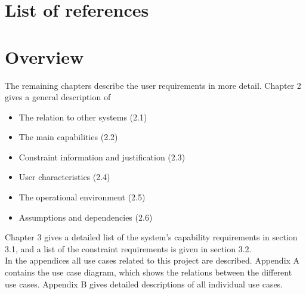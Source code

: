\section{List of references}


\section{Overview}

The remaining chapters describe the user requirements in more detail. Chapter 2 gives a general description of
\begin{itemize}
\item The relation to other systems (2.1)
\item The main capabilities (2.2)
\item Constraint information and justification (2.3)
\item User characteristics (2.4)
\item The operational environment (2.5)
\item Assumptions and dependencies (2.6)
\end{itemize}

Chapter 3 gives a detailed list of the system's capability requirements in section 3.1, and a list of the constraint requirements is given in section 3.2.\\
In the appendices all use cases related to this project are described. Appendix A contains the use case diagram, which shows the relations between the different use cases. Appendix B gives detailed descriptions of all individual use cases.
